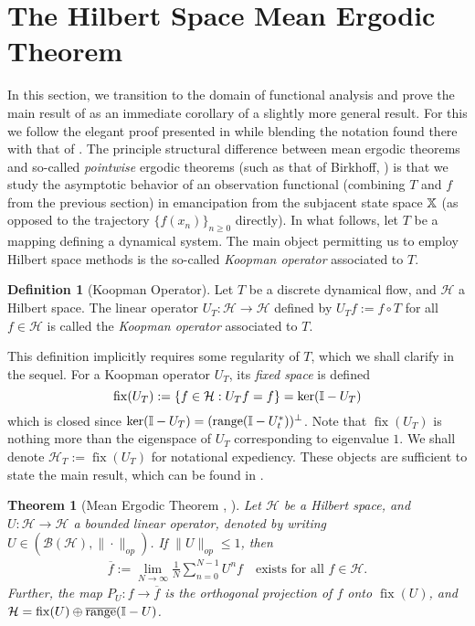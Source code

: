 \documentclass[11pt]{report}
\newcommand{\mc}[1]{\mathcal{#1}}
\newcommand{\1}[1]{\mathbbm{1}_{\{#1\}}}
\DeclareMathOperator{\fix}{fix}
\DeclareMathOperator{\ran}{range}
\newtheorem{theorem}{Theorem}[section]
\theoremstyle{definition}
\newtheorem{definition}{Definition}
\begin{document}
    \section{The Hilbert Space Mean Ergodic Theorem}\label{sec2}
    In this section, we transition to the domain of functional analysis and
    prove the main result of \cite{Neumann_1932} as an immediate corollary of a
    slightly more general result. For this we follow the elegant proof presented
    in \cite[theorem 1.3.1]{Weber_2000} while blending the notation found there
    with that of \cite[ch.8]{Eisner_Farkas_Haase_Nagel_2015}. The principle
    structural difference between mean ergodic theorems and so-called
    \textit{pointwise} ergodic theorems (such as that of Birkhoff,
    \cite{Birkhoff_1931}) is that we study the asymptotic behavior of an
    observation functional (combining $T$ and $f$ from the previous section) in
    emancipation from the subjacent state space $\mathbb{X}$ (as opposed to the
    trajectory $\{f(x_n)\}_{n\geq 0}$ directly). In what follows, let $T$ be a
    mapping defining a dynamical system. The main object permitting us to employ
    Hilbert space methods is the so-called {\it Koopman operator} associated to
    $T$.
    \begin{definition}[Koopman Operator]\label{def1} Let $T$ be a discrete
        dynamical flow, and $\mc{H}$ a Hilbert space. The linear operator
        $U_T:\mc{H}\rightarrow \mc{H}$ defined by $U_Tf:=f\circ T$ for all $f\in
        \mc{H}$ is called the \textit{Koopman operator} associated to $T$.
    \end{definition}
    This definition implicitly requires some regularity of $T$, which we shall
    clarify in the sequel. For a Koopman operator $U_T$, its \textit{fixed
    space} is defined
    \[\fix(U_T):=\{f\in\mc{H}:U_Tf=f\}=\ker(\mbb{I}-U_T)\] which is closed since
    $\ker(\mbb{I}-U_T)=(\ran(\mbb{I}-U_t^\ast))^{\perp}$. Note that $\fix(U_T)$ is nothing more than the eigenspace
    of $U_T$ corresponding to eigenvalue $1$. We shall denote
    $\mc{H}_T:=\fix(U_T)$ for notational expediency. These objects are
    sufficient to state the main result, which can be found in \cite[theorem
    8.6]{Eisner_Farkas_Haase_Nagel_2015}.
    \begin{theorem}[Mean Ergodic Theorem {\cite[theorem
        8.6]{Eisner_Farkas_Haase_Nagel_2015}}, {\cite[theorem
        1.3.1]{Weber_2000}}]\label{thm1} Let $\mc{H}$ be a Hilbert space, and
        $U:\mc{H}\rightarrow\mc{H}$ a bounded linear operator, denoted by writing
        $U\in(\mc{B}(\mc{H}),\|\cdot\|_{op})$. If $\|U\|_{op}\leq 1$, then
        \begin{align*}
            \overline{f}:=\lim_{N\rightarrow\infty}\frac{1}{N}\sum_{n=0}^{N-1}U^nf\quad\text{exists for all $f\in\mc{H}$.}
        \end{align*}
        Further, the map $P_{U}:f\rightarrow\overline{f}$ is the orthogonal
        projection of $f$ onto $\fix(U)$, and
        $\mc{H}=\fix(U)\oplus\overline{\ran}(\mbb{I}-U)$.
    \end{theorem}
\end{document}
